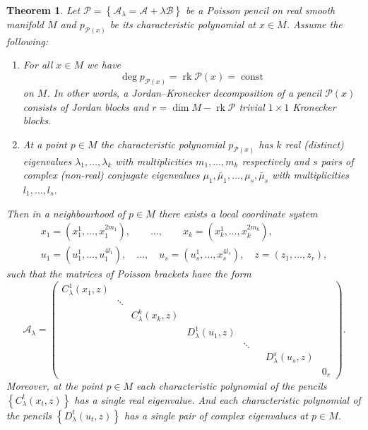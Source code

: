 \documentclass[12pt]{article}
\newtheorem{theorem}[lemma]{Theorem}
\theoremstyle{definition}
\begin{document}
\begin{theorem}  \label{T:TrivKronFact} Let $\mathcal{P} = \left\{ \mathcal{A}_{\lambda} = \mathcal{A} + \lambda \mathcal{B}\right\}$ be a Poisson pencil on real smooth manifold $M$ and $p_{\mathcal{P}(x)}$ be its characteristic polynomial at $x\in M$. Assume the following:

\begin{enumerate}
    \item For all $x \in M$ we have \[\deg p_{\mathcal{P}(x)} =  \operatorname{rk} \mathcal{P}(x) = \operatorname{const}\] on $M$. In other words, a Jordan--Kronecker decomposition of a pencil $\mathcal{P}(x)$ consists of Jordan blocks and $r = \dim M - \operatorname{rk}\mathcal{P}$ trivial $1 \times 1$ Kronecker blocks. 

\item At a point $p \in M$ the characteristic polynomial $p_{\mathcal{P}(x)}$  has $k$ real (distinct) eigenvalues $\lambda_1, \dots, \lambda_k$  with multiplicities $m_1, \dots, m_k$ respectively and $s$ pairs of complex (non-real) conjugate eigenvalues $\mu_1, \bar{\mu}_1,\dots, \mu_s, \bar{\mu}_s$ with  multiplicities $l_1, \dots, l_s$.
    
\end{enumerate}  Then in a neighbourhood of $p \in M$ there exists a local coordinate
system
\begin{gather*} x_1 = \left(x_1^1, \dots, x_1^{2m_1}\right), \qquad \dots, \qquad x_k = \left(x_k^1, \dots, x_k^{2m_k}\right), \\ u_1 = \left(u_1^1, \dots, u_1^{4l_1}\right), \quad \dots, \quad u_s = \left(u_s^1, \dots, x_s^{4l_s}\right), \quad z = (z_1, \dots, z_r), \end{gather*} such that the matrices of Poisson brackets have the form \begin{equation} \label{Eq:FormOneEigen} \mathcal{A}_{\lambda} = \left( \begin{matrix} C^1_{\lambda}(x_1, z) & & & & & & & \\ & \ddots & & & & & \\ & & C^k_{\lambda}(x_k, z) & & & & & \\ & & & D^1_{\lambda}(u_1, z) & & & & \\ & & & & \ddots & & & \\ & & &  & & & D^s_{\lambda}(u_s, z)  & \\ & & &  & & &   & 0_r \end{matrix} \right). \end{equation} Moreover,  at the point $p \in M$ each characteristic polynomial of the pencils $\left\{ C^t_{\lambda}(x_t, z) \right\}$ has a single real eigenvalue. And each characteristic polynomial of the pencils $\left\{ D^t_{\lambda}(u_t, z) \right\}$ has a single pair of complex eigenvalues at $p \in M$. \end{theorem}
\end{document}
